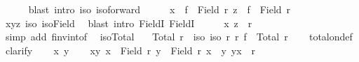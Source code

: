 \begin{isabellebody}
\ \ \ \ \isamarkupfalse%
\ {\isacharparenleft}{\kern0pt}blast\ intro{\isacharcolon}{\kern0pt}\ iso\ iso{\isacharunderscore}{\kern0pt}forward{\isacharparenright}{\kern0pt}\isanewline
\ \ \isamarkupfalse%
\ \isamarkupfalse%
\ {\isachardoublequoteopen}x\ {\isasymin}\ f\ {\isacharbackquote}{\kern0pt}\ Field\ r{\isachardoublequoteclose}\ {\isachardoublequoteopen}z\ {\isasymin}\ f\ {\isacharbackquote}{\kern0pt}\ Field\ r{\isachardoublequoteclose}\isanewline
\ \ \ \ \isamarkupfalse%
\ xyz\ iso\ iso{\isacharunderscore}{\kern0pt}Field\ \isamarkupfalse%
\ {\isacharparenleft}{\kern0pt}blast\ intro{\isacharcolon}{\kern0pt}\ FieldI{}\ FieldI{}{\isacharparenright}{\kern0pt}{\isacharplus}{\kern0pt}\isanewline
\ \ \isamarkupfalse%
\ \isamarkupfalse%
\ {\isachardoublequoteopen}{\isacharparenleft}{\kern0pt}x{\isacharcomma}{\kern0pt}\ z{\isacharparenright}{\kern0pt}\ {\isasymin}\ r{\isacharprime}{\kern0pt}{\isachardoublequoteclose}\isanewline
\ \ \ \ \isamarkupfalse%
\ {\isacharparenleft}{\kern0pt}simp\ add{\isacharcolon}{\kern0pt}\ f{\isacharunderscore}{\kern0pt}inv{\isacharunderscore}{\kern0pt}into{\isacharunderscore}{\kern0pt}f{\isacharparenright}{\kern0pt}\ \isanewline
{}\isamarkupfalse%
%
\endisatagproof
{\isafoldproof}%
%
\isadelimproof
\isanewline
%
\endisadelimproof
\isanewline
{}\isamarkupfalse%
\ iso{\isacharunderscore}{\kern0pt}Total{\isacharcolon}{\kern0pt}\isanewline
\ \ \ {\isachardoublequoteopen}Total\ r{\isachardoublequoteclose}\ \ iso{\isacharcolon}{\kern0pt}\ {\isachardoublequoteopen}iso\ r\ r{\isacharprime}{\kern0pt}\ f{\isachardoublequoteclose}\ \ {\isachardoublequoteopen}Total\ r{\isacharprime}{\kern0pt}{\isachardoublequoteclose}\isanewline
%
\isadelimproof
\ \ %
\endisadelimproof
%
\isatagproof
{}\isamarkupfalse%
\ total{\isacharunderscore}{\kern0pt}on{\isacharunderscore}{\kern0pt}def\isanewline
{}\isamarkupfalse%
\ clarify\isanewline
\ \ \isamarkupfalse%
\ x\ y\isanewline
\ \ \isamarkupfalse%
\ xy{\isacharcolon}{\kern0pt}\ {\isachardoublequoteopen}x\ {\isasymin}\ Field\ r{\isacharprime}{\kern0pt}{\isachardoublequoteclose}\ {\isachardoublequoteopen}y\ {\isasymin}\ Field\ r{\isacharprime}{\kern0pt}{\isachardoublequoteclose}\ {\isachardoublequoteopen}x\ {\isasymnoteq}\ y{\isachardoublequoteclose}\ {\isachardoublequoteopen}{\isacharparenleft}{\kern0pt}y{\isacharcomma}{\kern0pt}x{\isacharparenright}{\kern0pt}\ {\isasymnotin}\ r{\isacharprime}{\kern0pt}{\isachardoublequoteclose}\isanewline

\end{isabellebody}
